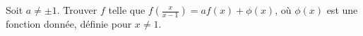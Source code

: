 Soit $a \neq \pm 1$. Trouver $f$ telle que $f\left(\frac{x}{x - 1}\right) = af(x) + \phi(x)$, où $\phi(x)$ est une fonction donnée, définie pour $x \neq 1$.
